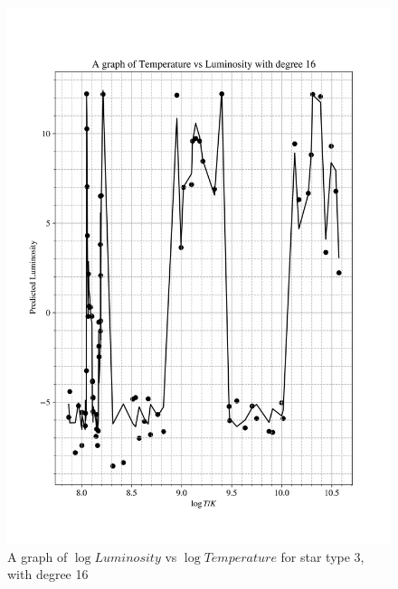 \documentclass[12pt, a4paper]{article}
\begin{document}
\begin{figure}[H]
    \centering
    \includegraphics[width = \textwidth]{2Plot4_16.png}
    \caption{A graph of \(\log{Luminosity}\) vs \(\log{Temperature}\) for star type 3, with degree 16}
\end{figure}
\end{document}
